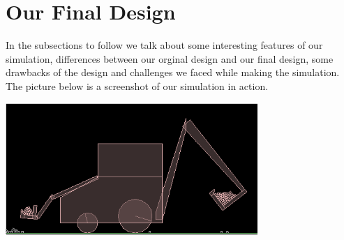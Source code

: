 \documentclass[11pt]{article}
\begin{document}
\section{Our Final Design}
	In the subsections to follow we talk about some interesting features of our simulation, differences between our orginal design and our final design, some drawbacks of the design and challenges we faced while making the simulation. The picture below is a screenshot of our simulation in action.
	\begin{center}\includegraphics[height=5cm]{FinalDesign2.png}\end{center}
\end{document}
